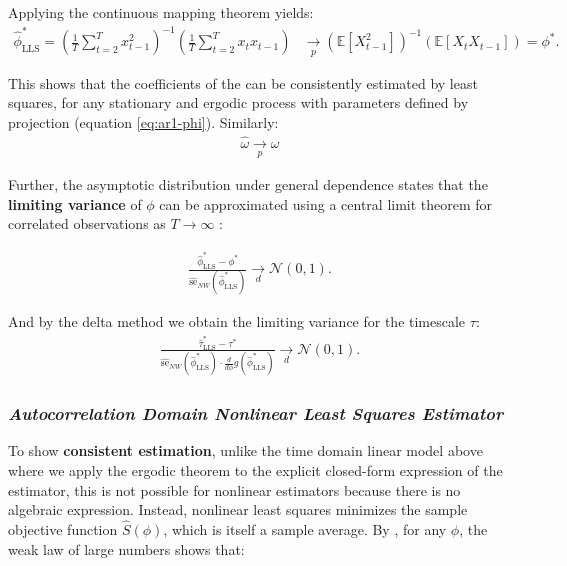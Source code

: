 \documentclass[main.tex]{subfiles}
\begin{document}
\noindent Applying the continuous mapping theorem yields:
\begin{align}
    \hat\phi^*_{\scriptscriptstyle\text{LLS}} = (\frac{1}{T} \sum_{t=2}^T x_{t-1}^2)^{-1} ( \frac{1}{T} \sum_{t=2}^T x_t x_{t-1}) &\underset{p}{\to} (\mathbb{E}[X_{t-1}^2])^{-1}(\mathbb{E}[X_t X_{t-1}]) = \phi^*.
\end{align}

\noindent This shows that the coefficients of the  can be consistently estimated by least squares, for any stationary and ergodic process with parameters defined by projection (equation \eqref{eq:ar1-phi}). Similarly:
\begin{align}
    \hat \omega \underset{p}{\to} \omega
\end{align}

Further, the asymptotic distribution under general dependence states that the \textbf{limiting variance} of $\phi$ can be approximated using a central limit theorem for correlated observations as $T\to\infty$ \citet[theorem~14.33]{hansen_econometrics_2022}:

\begin{align} \label{eq:ar1-phi-clt}
\frac{\hat\phi^*_{\scriptscriptstyle\text{LLS}} - \phi^*}{\widehat{\text{se}}_{NW}(\hat\phi^*_{\scriptscriptstyle\text{LLS}})} \underset{d}{\to} \mathcal{N}(0, 1).
\end{align}

\noindent And by the delta method we obtain the limiting variance for the timescale $\tau$:
\begin{align}
    \frac{\hat{\tau}^*_{\scriptscriptstyle\text{LLS}} - \tau^*}{\widehat{\text{se}}_{NW}(\hat{\phi}^*_{\scriptscriptstyle\text{LLS}}) \cdot \frac{d}{d\phi} g(\hat \phi^*_{\scriptscriptstyle\text{LLS}})} \underset{d}{\to} \mathcal{N}(0,1).
\end{align}



\subsubsection{\normalfont\textit{Autocorrelation Domain Nonlinear Least Squares Estimator}}

To show \textbf{consistent estimation}, unlike the time domain linear model above where we apply the ergodic theorem to the explicit closed-form expression of the estimator, this is not possible for nonlinear estimators because there is no algebraic expression. Instead, nonlinear least squares minimizes the sample objective function $\widehat{S}(\phi)$, which is itself a sample average. By \citet[theorem~22.1]{hansen_econometrics_2022}, for any $\phi$, the weak law of large numbers shows that:
\end{document}
